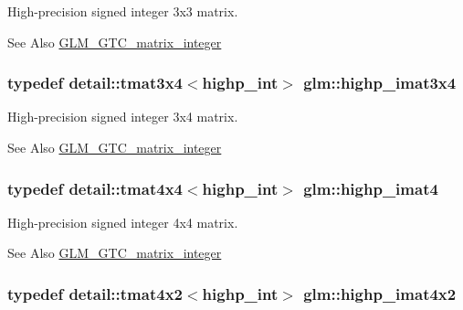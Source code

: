 High-\/precision signed integer 3x3 matrix. 

\begin{DoxySeeAlso}{See Also}
\hyperlink{group__gtc__matrix__integer}{G\-L\-M\-\_\-\-G\-T\-C\-\_\-matrix\-\_\-integer} 
\end{DoxySeeAlso}
\hypertarget{group__gtc__matrix__integer_gab0609d65fae60184ade419c6e4edc812}{
\subsubsection[{highp\-\_\-imat3x4}]{\setlength{\rightskip}{0pt plus 5cm}typedef detail\-::tmat3x4$<$highp\-\_\-int$>$ {\bf glm\-::highp\-\_\-imat3x4}}}\label{group__gtc__matrix__integer_gab0609d65fae60184ade419c6e4edc812}


High-\/precision signed integer 3x4 matrix. 

\begin{DoxySeeAlso}{See Also}
\hyperlink{group__gtc__matrix__integer}{G\-L\-M\-\_\-\-G\-T\-C\-\_\-matrix\-\_\-integer} 
\end{DoxySeeAlso}
\hypertarget{group__gtc__matrix__integer_ga59980867b7f2a7ec595fbb283a555d4c}{
\subsubsection[{highp\-\_\-imat4}]{\setlength{\rightskip}{0pt plus 5cm}typedef detail\-::tmat4x4$<$highp\-\_\-int$>$ {\bf glm\-::highp\-\_\-imat4}}}\label{group__gtc__matrix__integer_ga59980867b7f2a7ec595fbb283a555d4c}


High-\/precision signed integer 4x4 matrix. 

\begin{DoxySeeAlso}{See Also}
\hyperlink{group__gtc__matrix__integer}{G\-L\-M\-\_\-\-G\-T\-C\-\_\-matrix\-\_\-integer} 
\end{DoxySeeAlso}
\hypertarget{group__gtc__matrix__integer_gaf7ffcc749993239f1871f1acd8b06cca}{
\subsubsection[{highp\-\_\-imat4x2}]{\setlength{\rightskip}{0pt plus 5cm}typedef detail\-::tmat4x2$<$highp\-\_\-int$>$ {\bf glm\-::highp\-\_\-imat4x2}}}\label{group__gtc__matrix__integer_gaf7ffcc749993239f1871f1acd8b06cca}



